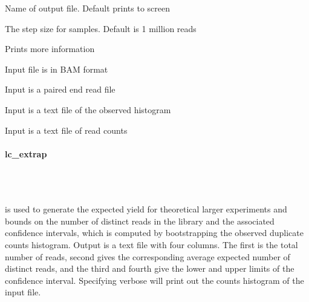 \documentclass[11pt, titlepage]{article}
\begin{document}
\begin{description}[style=multiline,leftmargin=6cm,font=\ttfamily]
\item[\begingroup \fontsize{9pt}{12pt}\selectfont-o, -output\endgroup] Name of output file. Default prints to screen
\item[\begingroup \fontsize{9pt}{12pt}\selectfont-s, -step\endgroup] The step size for samples. Default is 1 million reads
\item[\begingroup \fontsize{9pt}{12pt}\selectfont-v -verbose\endgroup] Prints more information
\item[\begingroup \fontsize{9pt}{12pt}\selectfont-B, -bam\endgroup] Input file is in BAM format
\item[\begingroup \fontsize{9pt}{12pt}\selectfont-P, -pe\endgroup] Input is a paired end read file
\item[\begingroup \fontsize{9pt}{12pt}\selectfont-H, -hist\endgroup] Input is a text file of the observed histogram
\item[\begingroup \fontsize{9pt}{12pt}\selectfont-V, -vals\endgroup] Input is a text file of read counts
\end{description}

\newpage

\paragraph{lc\_extrap}~\\~\\[-.2cm]
\label{sec:librarycomplexity}

 is used to generate
the expected yield for theoretical larger
experiments and bounds on the number of distinct 
reads in the library and the associated confidence
intervals, which is computed by bootstrapping the observed duplicate counts histogram.
Output is a text file with four columns.  The
first is the total number of reads, second
gives the corresponding average
expected number of distinct reads, and the 
third and fourth give the lower and
upper
limits of the confidence interval.
Specifying verbose will print out the counts histogram
of the input file.  
\end{document}
